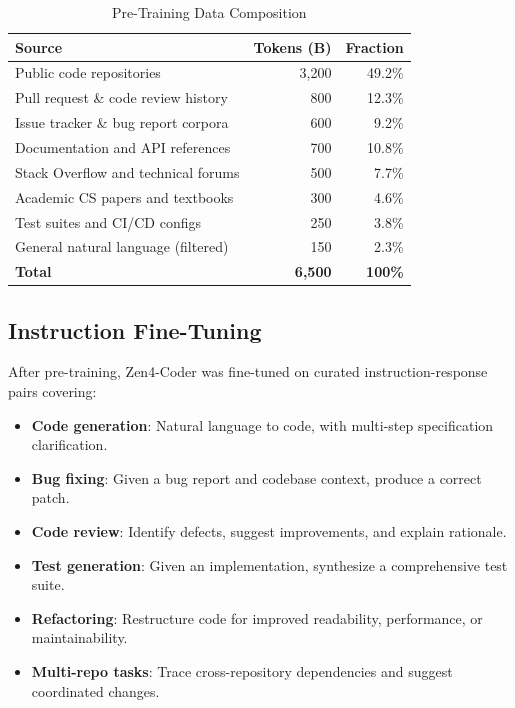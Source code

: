 \documentclass[11pt,a4paper]{article}
\begin{document}
\begin{table}[H]
\centering
\caption{Pre-Training Data Composition}
\begin{tabular}{lrr}
\toprule
\textbf{Source} & \textbf{Tokens (B)} & \textbf{Fraction} \\
\midrule
Public code repositories & 3,200 & 49.2\% \\
Pull request \& code review history & 800 & 12.3\% \\
Issue tracker \& bug report corpora & 600 & 9.2\% \\
Documentation and API references & 700 & 10.8\% \\
Stack Overflow and technical forums & 500 & 7.7\% \\
Academic CS papers and textbooks & 300 & 4.6\% \\
Test suites and CI/CD configs & 250 & 3.8\% \\
General natural language (filtered) & 150 & 2.3\% \\
\midrule
\textbf{Total} & \textbf{6,500} & \textbf{100\%} \\
\bottomrule
\end{tabular}
\end{table}

\subsection{Instruction Fine-Tuning}

After pre-training, Zen4-Coder was fine-tuned on curated instruction-response pairs covering:

\begin{itemize}
  \item \textbf{Code generation}: Natural language to code, with multi-step specification clarification.
  \item \textbf{Bug fixing}: Given a bug report and codebase context, produce a correct patch.
  \item \textbf{Code review}: Identify defects, suggest improvements, and explain rationale.
  \item \textbf{Test generation}: Given an implementation, synthesize a comprehensive test suite.
  \item \textbf{Refactoring}: Restructure code for improved readability, performance, or maintainability.
  \item \textbf{Multi-repo tasks}: Trace cross-repository dependencies and suggest coordinated changes.
\end{itemize}
\end{document}
